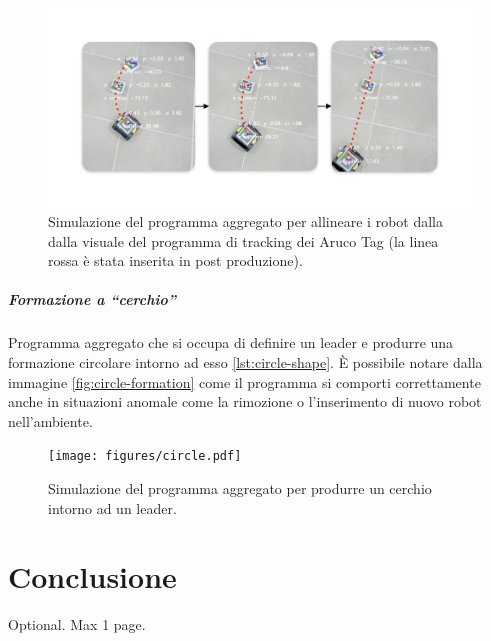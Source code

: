 \documentclass[12pt,a4paper,openright,twoside]{book}
\begin{document}
\begin{figure}
    \centering
    \includegraphics[width=.99\linewidth]{figures/line1.pdf}
    \caption{Simulazione del programma aggregato per allineare i robot dalla dalla visuale del programma di tracking dei Aruco Tag (la linea rossa è  stata inserita in post produzione).}
    \label{fig:line-shape-1}
\end{figure}

\paragraph{Formazione a ``cerchio''}

Programma aggregato che si occupa di definire un leader e produrre una formazione circolare intorno ad esso \cref{lst:circle-shape}. È possibile notare dalla immagine \cref{fig:circle-formation} come il programma si comporti correttamente anche in situazioni anomale come la rimozione o l'inserimento di nuovo robot nell'ambiente.



\begin{figure}
    \centering
    \texttt{[image: figures/circle.pdf]}
    \caption{Simulazione del programma aggregato per produrre un cerchio intorno ad un leader.}
    \label{fig:line-shape-1}
\end{figure}

\chapter{Conclusione}
\label{chap:conclusione}


\backmatter

\nocite{*} %




\begin{acknowledgements} %
Optional. Max 1 page.
\end{acknowledgements}
\end{document}
